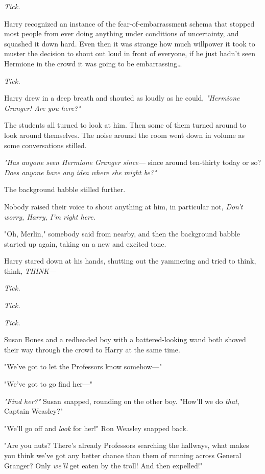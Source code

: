 \emph{Tick.}

Harry recognized an instance of the fear-of-embarrassment schema that stopped most people from ever doing anything under conditions of uncertainty, and squashed it down hard. Even then it was strange how much willpower it took to muster the decision to shout out loud in front of everyone, if he just hadn't seen Hermione in the crowd it was going to be embarrassing{\ldots}

\emph{Tick.}

Harry drew in a deep breath and shouted as loudly as he could, \emph{"Hermione Granger! Are you here?"}

The students all turned to look at him. Then some of them turned around to look around themselves. The noise around the room went down in volume as some conversations stilled.

\emph{"Has anyone seen Hermione Granger since---} since around ten-thirty today or so? \emph{Does anyone have any idea where she might be?"}

The background babble stilled further.

Nobody raised their voice to shout anything at him, in particular not, \emph{Don't worry, Harry, I'm right here.}

"Oh, Merlin," somebody said from nearby, and then the background babble started up again, taking on a new and excited tone.

Harry stared down at his hands, shutting out the yammering and tried to think, think, \emph{THINK---}

\emph{Tick.}

\emph{Tick.}

\emph{Tick.}

Susan Bones and a redheaded boy with a battered-looking wand both shoved their way through the crowd to Harry at the same time.

"We've got to let the Professors know somehow---"

"We've got to go find her---"

\emph{"Find her?"} Susan snapped, rounding on the other boy. "How'll we do \emph{that}, Captain Weasley?"

"We'll go off and \emph{look} for her!" Ron Weasley snapped back.

"Are you nuts? There's already Professors searching the hallways, what makes you think we've got any better chance than them of running across General Granger? Only \emph{we'll} get eaten by the troll! And then expelled!"

